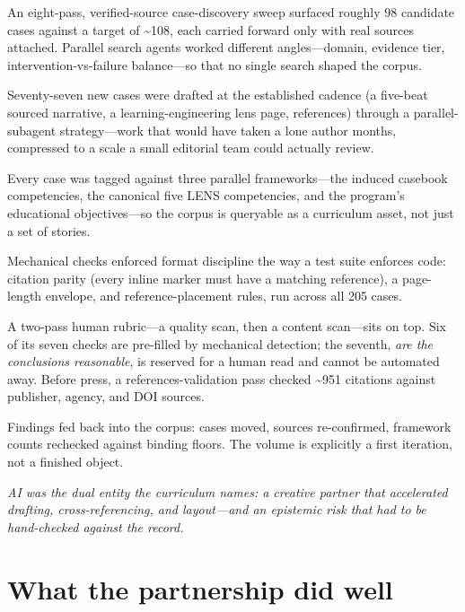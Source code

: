 \documentclass[11pt]{article}
\newcommand{\pullquote}[1]{%
  \begin{center}\begin{minipage}{0.86\linewidth}
  \color{lensquote}\itshape\large\RaggedRight #1
  \end{minipage}\end{center}}
\begin{document}
\begin{description}[leftmargin=0em,itemsep=3pt,topsep=3pt,font=\color{lensink}\bfseries]
  \item[Discover.] An eight-pass, verified-source case-discovery sweep surfaced roughly 98 candidate cases against a target of \textasciitilde108, each carried forward only with real sources attached. Parallel search agents worked different angles---domain, evidence tier, intervention-vs-failure balance---so that no single search shaped the corpus.
  \item[Draft.] Seventy-seven new cases were drafted at the established cadence (a five-beat sourced narrative, a learning-engineering lens page, references) through a parallel-subagent strategy---work that would have taken a lone author months, compressed to a scale a small editorial team could actually review.
  \item[Anchor.] Every case was tagged against three parallel frameworks---the induced casebook competencies, the canonical five LENS competencies, and the program's educational objectives---so the corpus is queryable as a curriculum asset, not just a set of stories.
  \item[Instrument.] Mechanical checks enforced format discipline the way a test suite enforces code: citation parity (every inline marker must have a matching reference), a page-length envelope, and reference-placement rules, run across all 205 cases.
  \item[Verify.] A two-pass human rubric---a quality scan, then a content scan---sits on top. Six of its seven checks are pre-filled by mechanical detection; the seventh, \emph{are the conclusions reasonable}, is reserved for a human read and cannot be automated away. Before press, a references-validation pass checked \textasciitilde951 citations against publisher, agency, and DOI sources.
  \item[Iterate.] Findings fed back into the corpus: cases moved, sources re-confirmed, framework counts rechecked against binding floors. The volume is explicitly a first iteration, not a finished object.
\end{description}

\pullquote{AI was the dual entity the curriculum names: a creative partner that accelerated drafting, cross-referencing, and layout---and an epistemic risk that had to be hand-checked against the record.}

\section{What the partnership did well}
\end{document}

